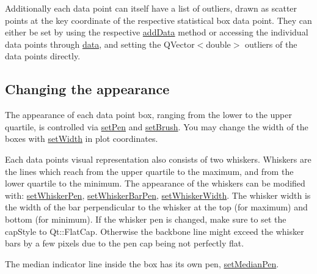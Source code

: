 Additionally each data point can itself have a list of outliers, drawn as scatter points at the key coordinate of the respective statistical box data point. They can either be set by using the respective \hyperlink{class_q_c_p_statistical_box_a026f2790b530d6f29312254ecb1e7c1e}{add\+Data} method or accessing the individual data points through \hyperlink{class_q_c_p_statistical_box_a99de828ddad81bb79aaed7db54b87e3f}{data}, and setting the {\ttfamily Q\+Vector$<$double$>$ outliers} of the data points directly.\hypertarget{class_q_c_p_statistical_box_qcpstatisticalbox-appearance}{}\subsection{Changing the appearance}\label{class_q_c_p_statistical_box_qcpstatisticalbox-appearance}
The appearance of each data point box, ranging from the lower to the upper quartile, is controlled via \hyperlink{class_q_c_p_abstract_plottable_ab74b09ae4c0e7e13142fe4b5bf46cac7}{set\+Pen} and \hyperlink{class_q_c_p_abstract_plottable_a7a4b92144dca6453a1f0f210e27edc74}{set\+Brush}. You may change the width of the boxes with \hyperlink{class_q_c_p_statistical_box_a0b62775bd67301b1eba5c785f2b26f14}{set\+Width} in plot coordinates.

Each data point\textquotesingle{}s visual representation also consists of two whiskers. Whiskers are the lines which reach from the upper quartile to the maximum, and from the lower quartile to the minimum. The appearance of the whiskers can be modified with\+: \hyperlink{class_q_c_p_statistical_box_a4a5034cb3b9b040444df05ab1684620b}{set\+Whisker\+Pen}, \hyperlink{class_q_c_p_statistical_box_aa8d3e503897788e1abf68dc74b5f147f}{set\+Whisker\+Bar\+Pen}, \hyperlink{class_q_c_p_statistical_box_adf378812446bd66f34d1f7f293d991cd}{set\+Whisker\+Width}. The whisker width is the width of the bar perpendicular to the whisker at the top (for maximum) and bottom (for minimum). If the whisker pen is changed, make sure to set the {\ttfamily cap\+Style} to {\ttfamily Qt\+::\+Flat\+Cap}. Otherwise the backbone line might exceed the whisker bars by a few pixels due to the pen cap being not perfectly flat.

The median indicator line inside the box has its own pen, \hyperlink{class_q_c_p_statistical_box_a7260ac55b669f5d0a74f16d5ca84c52c}{set\+Median\+Pen}.

